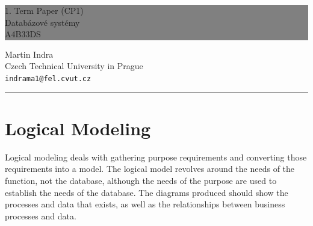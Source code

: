 \documentclass[12pt,oneside,a4paper]{article}
\newcommand{\HRule}[1]{\hfill \rule{0.2\linewidth}{#1}} %
\begin{document}
\thispagestyle{empty} %


\colorbox{grey}{
	\parbox[t]{1.0\linewidth}{
		\centering \fontsize{30pt}{50pt}\selectfont %
		\vspace*{0.7cm} %
		
		\hfill 1. Term Paper (CP1) \\
		\hfill Databázové systémy \\
		\hfill A4B33DS\par
		
		\vspace*{0.7cm} %
	}
}


\vfill %


{\centering \large 
\hfill Martin Indra \\
\hfill Czech Technical University in Prague \\
\hfill \texttt{indrama1@fel.cvut.cz} \\

\HRule{1pt}} %


\clearpage %
\newpage

\section{Logical Modeling}

Logical modeling deals with gathering purpose requirements and converting those requirements into a model. The logical model revolves around the needs of the function, not the database, although the needs of the purpose are used to establish the needs of the database. The diagrams produced should show the processes and data that exists, as well as the relationships between business processes and data.
\end{document}
